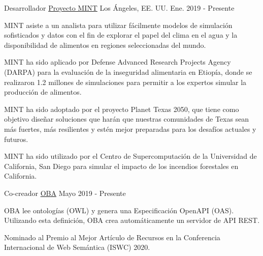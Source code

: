 \begin{cventries}
  \cventry
    {Desarrollador}
    {\href{https://mintproject.readthedocs.io/en/stable/}{Proyecto MINT}}
    {Los Ángeles, EE. UU.}
    {Ene. 2019 - Presente}
    {
      \begin{cvitems}
        \item {MINT asiste a un analista para utilizar fácilmente modelos de simulación sofisticados y datos con el fin de explorar el papel del clima en el agua y la disponibilidad de alimentos en regiones seleccionadas del mundo.}
        \item {MINT ha sido aplicado por Defense Advanced Research Projects Agency (DARPA) para la evaluación de la inseguridad alimentaria en Etiopía, donde se realizaron 1.2 millones de simulaciones para permitir a los expertos simular la producción de alimentos.}
        \item {MINT ha sido adoptado por el proyecto Planet Texas 2050, que tiene como objetivo diseñar soluciones que harán que nuestras comunidades de Texas sean más fuertes, más resilientes y estén mejor preparadas para los desafíos actuales y futuros.}
        \item {MINT ha sido utilizado por el Centro de Supercomputación de la Universidad de California, San Diego para simular el impacto de los incendios forestales en California.}
      \end{cvitems}
    }
  \cventry
      {Co-creador}
      {\href{https://github.com/KnowledgeCaptureAndDiscovery/OBA}{OBA}}
      {}
      {Mayo 2019 - Presente}
      {
        \begin{cvitems}
          \item {OBA lee ontologías (OWL) y genera una Especificación OpenAPI (OAS). Utilizando esta definición, OBA crea automáticamente un servidor de API REST.}
          \item {Nominado al Premio al Mejor Artículo de Recursos en la Conferencia Internacional de Web Semántica (ISWC) 2020.}
        \end{cvitems}
      }
\end{cventries}